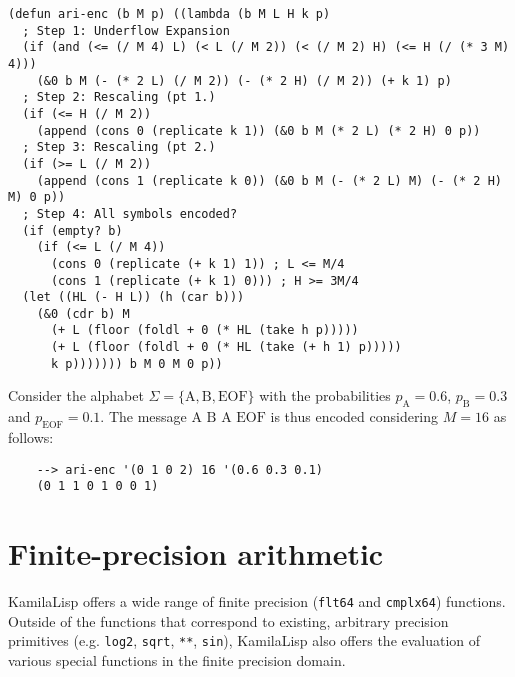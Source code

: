 \begin{Verbatim}
(defun ari-enc (b M p) ((lambda (b M L H k p)
  ; Step 1: Underflow Expansion
  (if (and (<= (/ M 4) L) (< L (/ M 2)) (< (/ M 2) H) (<= H (/ (* 3 M) 4)))
    (&0 b M (- (* 2 L) (/ M 2)) (- (* 2 H) (/ M 2)) (+ k 1) p)
  ; Step 2: Rescaling (pt 1.)
  (if (<= H (/ M 2))
    (append (cons 0 (replicate k 1)) (&0 b M (* 2 L) (* 2 H) 0 p))
  ; Step 3: Rescaling (pt 2.)
  (if (>= L (/ M 2))
    (append (cons 1 (replicate k 0)) (&0 b M (- (* 2 L) M) (- (* 2 H) M) 0 p))
  ; Step 4: All symbols encoded?
  (if (empty? b)
    (if (<= L (/ M 4))
      (cons 0 (replicate (+ k 1) 1)) ; L <= M/4
      (cons 1 (replicate (+ k 1) 0))) ; H >= 3M/4
  (let ((HL (- H L)) (h (car b)))
    (&0 (cdr b) M
      (+ L (floor (foldl + 0 (* HL (take h p)))))
      (+ L (floor (foldl + 0 (* HL (take (+ h 1) p)))))
      k p))))))) b M 0 M 0 p))
\end{Verbatim}

Consider the alphabet $\Sigma = \{\text{A}, \text{B}, \text{EOF}\}$ with the probabilities $p_\text{A} = 0.6$, $p_\text{B} = 0.3$ and $p_\text{EOF} = 0.1$. The message $\text{A B A EOF}$ is thus encoded considering $M = 16$ as follows:

\begin{Verbatim}
    --> ari-enc '(0 1 0 2) 16 '(0.6 0.3 0.1)
    (0 1 1 0 1 0 0 1)
\end{Verbatim}

\section{Finite-precision arithmetic}

KamilaLisp offers a wide range of finite precision (\verb|flt64| and \verb|cmplx64|) functions. Outside of the functions that correspond to existing, arbitrary precision primitives (e.g. \verb|log2|, \verb|sqrt|, \verb|**|, \verb|sin|), KamilaLisp also offers the evaluation of various special functions in the finite precision domain. 
